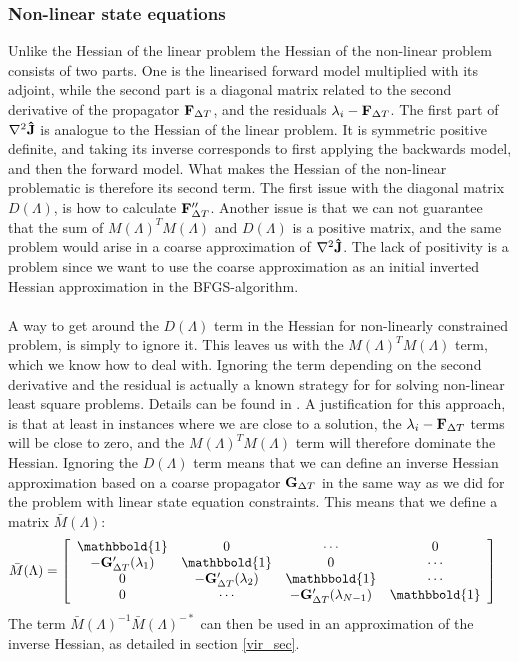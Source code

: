 \documentclass[11pt,a4paper]{article}
\begin{document}
\subsubsection{Non-linear state equations}
Unlike the Hessian of the linear problem the Hessian of the non-linear problem consists of two parts. One is the linearised forward model multiplied with its adjoint, while the second part is a diagonal matrix related to the second derivative of the propagator $\bold F_{\Delta T}$, and the residuals $\lambda_i-\bold F_{\Delta T}$. The first part of $\nabla^2 \bold{\hat{J}}$ is analogue to the Hessian of the linear problem. It is symmetric positive definite, and taking its inverse corresponds to first applying the backwards model, and then the forward model. What makes the Hessian of the non-linear problematic is therefore its second term. The first issue with the diagonal matrix $D(\Lambda)$, is how to calculate $\bold F_{\Delta T}''$. Another issue is that we can not guarantee that the sum of $M(\Lambda)^TM(\Lambda)$ and $D(\Lambda)$ is a positive matrix, and the same problem would arise in a coarse approximation of $\nabla^2 \bold{\hat{J}}$. The lack of positivity is a problem since we want to use the coarse approximation as an initial inverted Hessian approximation in the BFGS-algorithm.
\\
\\
A way to get around the $D(\Lambda)$ term in the Hessian for non-linearly constrained problem, is simply to ignore it. This leaves us with the $M(\Lambda)^TM(\Lambda)$ term, which we know how to deal with. Ignoring the term depending on the second derivative and the residual is actually a known strategy for for solving non-linear least square problems. Details can be found in \cite{nocedal2006numerical}. A justification for this approach, is that at least in instances where we are close to a solution, the $\lambda_i-\bold F_{\Delta T}$ terms will be close to zero, and the $M(\Lambda)^TM(\Lambda)$ term will therefore dominate the Hessian. Ignoring the $D(\Lambda)$ term means that we can define an inverse Hessian approximation based on a coarse propagator $\bold G_{\Delta T}$ in the same way as we did for the problem with linear state equation constraints. This means that we define a matrix $\bar M(\Lambda)$:
\begin{align}
\bar M(\Lambda) &= \left[ \begin{array}{cccc}
   \mathbbold{1} & 0 & \cdots & 0 \\  
   -\bold{G}_{\Delta T}'(\lambda_{1}) & \mathbbold{1} & 0 & \cdots \\ 
   0 &-\bold{G}_{\Delta T}'(\lambda_{2}) & \mathbbold{1}  & \cdots \\
   0 &\cdots &-\bold{G}_{\Delta T}'(\lambda_{N-1}) & \mathbbold{1}  \\
   \end{array}  \right] \label{ppc_linearized}
\end{align}
The term $\bar{M}(\Lambda)^{-1}\bar{M}(\Lambda)^{-*}$ can then be used in an approximation of the inverse Hessian, as detailed in section \ref{vir_sec}.
\end{document}
